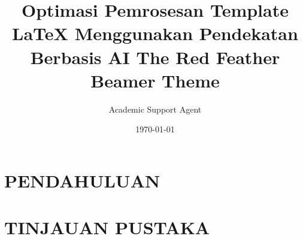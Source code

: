 \documentclass{beamer}
\title{Optimasi Pemrosesan Template LaTeX Menggunakan Pendekatan Berbasis AI}
\author{Academic Support Agent}
\date{\today}
\begin{document}
\maketitle

\begin{abstract}

\end{abstract}

\chapter{PENDAHULUAN}


\chapter{TINJAUAN PUSTAKA}


  






\usepackage[utf8]{inputenc}
\usepackage[english]{babel}
\usepackage[T1]{fontenc}
\usepackage{helvet}


\newcommand{\chref}[2]{
  \href{#1}{{\usebeamercolor[bg]{Feather}#2}}
}


\title[Feather Theme Red] %
{ %
      \textbf{The Red Feather Beamer Theme}
}
\end{document}
